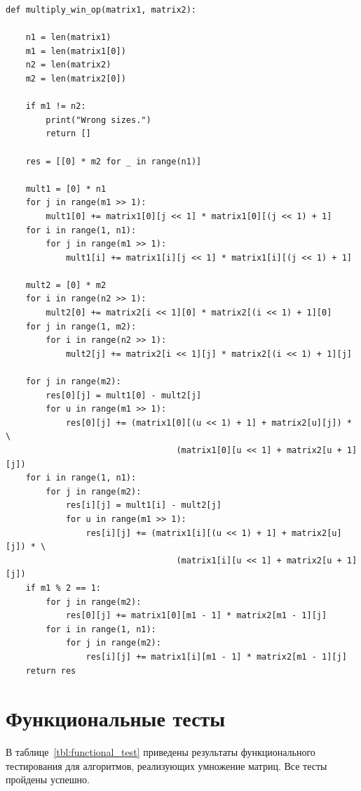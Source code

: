 \documentclass[a4paper, 12pt]{extreport}
\begin{document}
\begin{lstlisting}
def multiply_win_op(matrix1, matrix2):

    n1 = len(matrix1)
    m1 = len(matrix1[0])
    n2 = len(matrix2)
    m2 = len(matrix2[0])

    if m1 != n2:
        print("Wrong sizes.")
        return []
    
    res = [[0] * m2 for _ in range(n1)]

    mult1 = [0] * n1
    for j in range(m1 >> 1):
        mult1[0] += matrix1[0][j << 1] * matrix1[0][(j << 1) + 1]
    for i in range(1, n1):
        for j in range(m1 >> 1):
            mult1[i] += matrix1[i][j << 1] * matrix1[i][(j << 1) + 1]
            
    mult2 = [0] * m2
    for i in range(n2 >> 1):
        mult2[0] += matrix2[i << 1][0] * matrix2[(i << 1) + 1][0]
    for j in range(1, m2):
        for i in range(n2 >> 1):
            mult2[j] += matrix2[i << 1][j] * matrix2[(i << 1) + 1][j]

    for j in range(m2):
        res[0][j] = mult1[0] - mult2[j]
        for u in range(m1 >> 1):
            res[0][j] += (matrix1[0][(u << 1) + 1] + matrix2[u][j]) * \
                                  (matrix1[0][u << 1] + matrix2[u + 1][j])
    for i in range(1, n1):
        for j in range(m2):
            res[i][j] = mult1[i] - mult2[j]
            for u in range(m1 >> 1):
                res[i][j] += (matrix1[i][(u << 1) + 1] + matrix2[u][j]) * \
                                  (matrix1[i][u << 1] + matrix2[u + 1][j])
    if m1 % 2 == 1:
        for j in range(m2):
            res[0][j] += matrix1[0][m1 - 1] * matrix2[m1 - 1][j]
        for i in range(1, n1):
            for j in range(m2):
                res[i][j] += matrix1[i][m1 - 1] * matrix2[m1 - 1][j]
    return res
\end{lstlisting}
\captionsetup{justification=centering, singlelinecheck=off}
\label{lst:multiply_winograd_optimized}
\clearpage

\section{Функциональные тесты}
В таблице~\ref{tbl:functional_test} приведены результаты функционального тестирования для алгоритмов, реализующих умножение матриц. Все тесты пройдены успешно.
\end{document}
